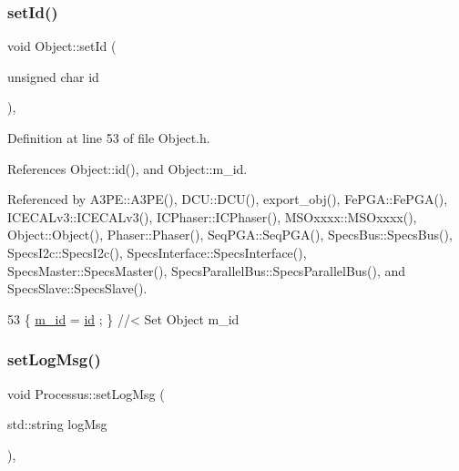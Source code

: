 \subsubsection{\texorpdfstring{set\+Id()}{setId()}}
{\footnotesize\ttfamily void Object\+::set\+Id (\begin{DoxyParamCaption}\item[{unsigned char}]{id }\end{DoxyParamCaption})\hspace{0.3cm}{\ttfamily [inline]}, {\ttfamily [inherited]}}



Definition at line 53 of file Object.\+h.



References Object\+::id(), and Object\+::m\+\_\+id.



Referenced by A3\+P\+E\+::\+A3\+P\+E(), D\+C\+U\+::\+D\+C\+U(), export\+\_\+obj(), Fe\+P\+G\+A\+::\+Fe\+P\+G\+A(), I\+C\+E\+C\+A\+Lv3\+::\+I\+C\+E\+C\+A\+Lv3(), I\+C\+Phaser\+::\+I\+C\+Phaser(), M\+S\+Oxxxx\+::\+M\+S\+Oxxxx(), Object\+::\+Object(), Phaser\+::\+Phaser(), Seq\+P\+G\+A\+::\+Seq\+P\+G\+A(), Specs\+Bus\+::\+Specs\+Bus(), Specs\+I2c\+::\+Specs\+I2c(), Specs\+Interface\+::\+Specs\+Interface(), Specs\+Master\+::\+Specs\+Master(), Specs\+Parallel\+Bus\+::\+Specs\+Parallel\+Bus(), and Specs\+Slave\+::\+Specs\+Slave().


\begin{DoxyCode}
53 \{ \hyperlink{classObject_aca74b9dbfed7b5556ea2d56c65b6b6b0}{m\_id}    = \hyperlink{classObject_af99145335cc61ff6e2798ea17db009d2}{id}    ; \} \textcolor{comment}{//< Set Object m\_id}
\end{DoxyCode}
\mbox{\label{classProcessus_a471833f89047aa9a7ff6200a31c17a1d}} 
\subsubsection{\texorpdfstring{set\+Log\+Msg()}{setLogMsg()}}
{\footnotesize\ttfamily void Processus\+::set\+Log\+Msg (\begin{DoxyParamCaption}\item[{std\+::string}]{log\+Msg }\end{DoxyParamCaption})\hspace{0.3cm}{\ttfamily [inline]}, {\ttfamily [inherited]}}

